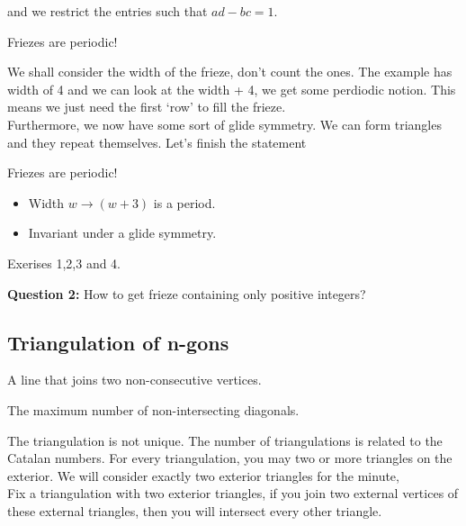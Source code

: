 \documentclass{article}
\begin{document}
and we restrict the entries such that $ad - bc = 1$.

\begin{nthm}[Coxeter]
  Friezes are periodic!
\end{nthm}

We shall consider the width of the frieze, don't count the ones. The example has width of 4 and we can look at the width + 4, we get some perdiodic notion. This means we just need the first `row' to fill the frieze.\\

Furthermore, we now have some sort of glide symmetry. We can form triangles and they repeat themselves. Let's finish the statement

\begin{nthm}[Coxeter]
  Friezes are periodic!
  \begin{itemize}
    \item Width $w \to (w+3)$ is a period.
    \item Invariant under a glide symmetry.
  \end{itemize}
\end{nthm}

\begin{ex}
  Exerises 1,2,3 and 4.
\end{ex}

\textbf{Question 2:} How to get frieze containing only positive integers?\\

\subsection{Triangulation of n-gons}

\begin{ndefi}[Diagonal]
  A line that joins two non-consecutive vertices.
\end{ndefi}

\begin{ndefi}[Triangulation]
  The maximum number of non-intersecting diagonals.
\end{ndefi}
The triangulation is not unique. The number of triangulations is related to the Catalan numbers. For every triangulation, you may two or more triangles on the exterior. We will consider exactly two exterior triangles for the minute,\\
Fix a triangulation with two exterior triangles, if you join two external vertices of these external triangles, then you will intersect every other triangle.\\
\end{document}
